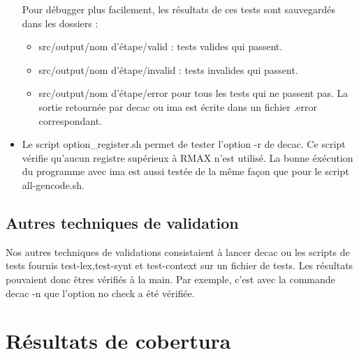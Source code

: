 \documentclass[11pt]{article}
\begin{document}
\begin{itemize}
Pour débugger plus facilement, les résultats de ces tests sont sauvegardés dans les dossiers :
\begin{itemize}
\item src/output/nom d'étape/valid :  tests valides qui passent.
\item src/output/nom d'étape/invalid : tests invalides qui passent.
\item src/output/nom d'étape/error pour tous les tests qui ne passent pas. La sortie retournée par decac ou ima est écrite dans un fichier .error correspondant.
\end{itemize}
\item Le script option\_register.sh permet de tester l'option -r de decac. Ce script vérifie qu'aucun registre supérieux à RMAX n'est utilisé. La bonne éxécution du programme avec ima est aussi testée de la même façon que pour le script all-gencode.sh.
\end{itemize}

\subsection{Autres techniques de validation}
Nos autres techniques de validations consistaient à lancer decac ou les scripts de tests fournis test-lex,test-synt et test-context sur un fichier de tests. Les résultats pouvaient donc êtres vérifiés à la main. Par exemple, c'est avec la commande decac -n que l'option no check a été vérifiée.
\section{Résultats de cobertura}

 
\end{document}
